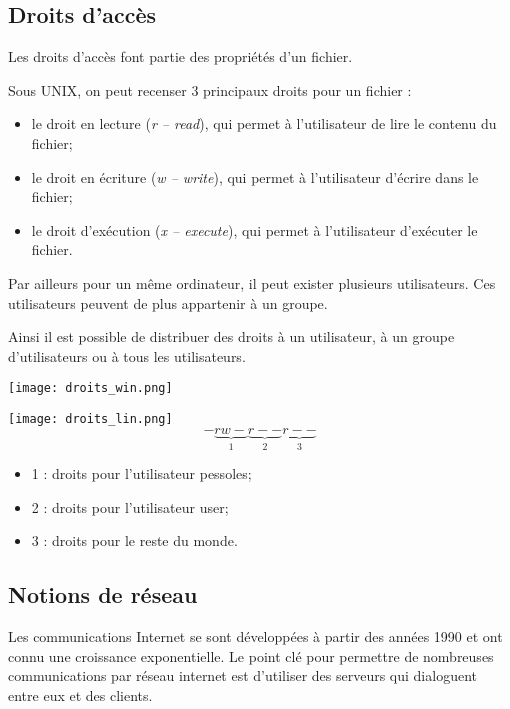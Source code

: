 \subsection{Droits d’accès}

Les droits d'accès font partie des propriétés d'un fichier. 

Sous UNIX, on peut recenser 3 principaux droits pour un fichier : 
\begin{itemize}
\item le droit en lecture (\textit{r -- read}), qui permet à l'utilisateur de lire le contenu du fichier;
\item le droit en écriture (\textit{w -- write}), qui permet à l'utilisateur d'écrire dans le fichier;
\item le droit d'exécution (\textit{x -- execute}), qui permet à l'utilisateur d'exécuter le fichier.
\end{itemize}

Par ailleurs pour un même ordinateur, il peut exister plusieurs utilisateurs. Ces utilisateurs peuvent de plus appartenir à un groupe.

Ainsi il est possible de distribuer des droits à un utilisateur, à un groupe d'utilisateurs ou à tous les utilisateurs.  

\begin{minipage}[c]{.45\linewidth}
\begin{center}
\texttt{[image: droits\_win.png]}
\end{center}
\end{minipage}\hfill
\begin{minipage}[c]{.45\linewidth}
\begin{center}
\texttt{[image: droits\_lin.png]}
$$
-\underbrace{rw-}_{1}\underbrace{r--}_{2}\underbrace{r--}_{3}
$$
\begin{itemize}
\item 1 : droits pour l'utilisateur pessoles;
\item 2 : droits pour l'utilisateur user;
\item 3 : droits pour le reste du monde.
\end{itemize}
\end{center}
\end{minipage}



\subsection{Notions de réseau}
Les communications Internet se sont développées à partir des années 1990 et ont connu une croissance exponentielle. Le point clé pour permettre de nombreuses communications par réseau internet est d’utiliser des serveurs qui dialoguent entre eux et des clients.
